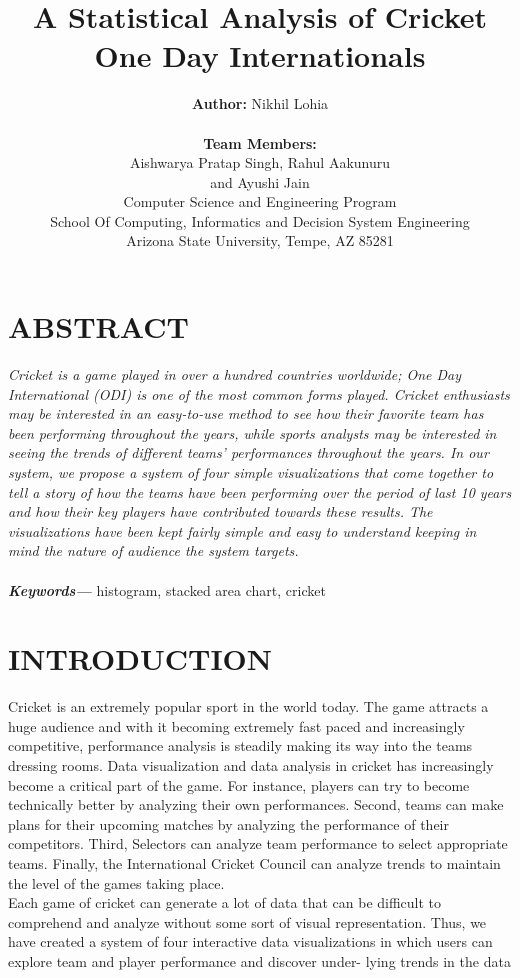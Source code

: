 \documentclass[letterpaper,10pt]{article}
\title{A Statistical Analysis of Cricket One Day Internationals}
\author{\textbf{Author:}  Nikhil Lohia \\ 
\vspace{+0.15cm}
\\
  \textbf{Team Members:} \\
  Aishwarya Pratap Singh, Rahul Aakunuru \\
  and Ayushi Jain \\
  \vspace{-0.25cm}
  \small{Computer Science and Engineering Program} \\
  \vspace{-0.25cm}
  \footnotesize{School Of Computing, Informatics and Decision System Engineering}\\
  \vspace{-0.25cm}
  \footnotesize{Arizona State University, Tempe, AZ 85281}}
\providecommand{\keywords}[1]{\textbf{\textit{Keywords---}} #1}
\begin{document}
\thispagestyle{empty}
\maketitle

\begin{multicols}{2}

\section{ABSTRACT}
\textit{Cricket is a game played in over a hundred countries worldwide; One Day International (ODI) is one of the most common forms played. Cricket enthusiasts may be interested in an easy-to-use method to see how their favorite team has been performing throughout the years, while sports analysts may be interested in seeing the trends of different teams' performances throughout the years. In our system, we propose a system of four simple visualizations that come together to tell a story of how the teams have been performing over the period of last 10 years and how their key players have contributed towards these results. The visualizations have been kept fairly simple and easy to understand keeping in mind the nature of audience the system targets.}\\ \\
\keywords{histogram, stacked area chart, cricket}

\section{INTRODUCTION}
Cricket is an extremely popular sport in the world today. The game attracts a huge audience and with it becoming extremely fast paced and increasingly competitive, performance analysis is steadily making its way into the teams dressing rooms. Data visualization and data analysis in cricket has increasingly become a critical part of the game. For instance, players can try to become technically better by analyzing their own performances. Second, teams can make plans for their upcoming matches by analyzing the performance of their competitors. Third, Selectors can analyze team performance to select appropriate teams. Finally, the International Cricket Council can analyze trends to maintain the level of the games taking place.\\
Each game of cricket can generate a lot of data that can be difficult to comprehend and analyze without some sort of visual representation. Thus, we have created a system of four interactive data visualizations in which users can explore team and player performance and discover under- lying trends in the data


\end{multicols}
\end{document}
